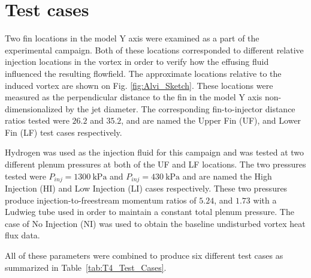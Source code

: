\documentclass{AIAA}
\begin{document}
\section{Test cases}

Two fin locations in the model Y axis were examined as a part of the experimental campaign.
Both of these locations corresponded to different relative injection locations in the vortex in order to verify how the effusing fluid influenced the resulting flowfield.
The approximate locations relative to the induced vortex are shown on Fig. \ref{fig:Alvi_Sketch}.
These locations were measured as the perpendicular distance to the fin in the model Y axis  non-dimensionalized by the jet diameter.
The corresponding fin-to-injector distance ratios tested were $26.2$ and $35.2$, and are named the Upper Fin (UF), and Lower Fin (LF) test cases respectively.


Hydrogen was used as the injection fluid for this campaign and was tested at two different plenum pressures at both of the UF and LF locations.
The two pressures tested were $P_{inj}=\SI{1300}{\kilo\pascal}$ and $P_{inj}=\SI{430}{\kilo\pascal}$ and are named the High Injection (HI) and Low Injection (LI) cases respectively.
These two pressures produce injection-to-freestream momentum ratios of $5.24$, and $1.73$ with a Ludwieg tube used in order to maintain a constant total plenum pressure.
The case of No Injection (NI) was used to obtain the baseline undisturbed vortex heat flux data.


All of these parameters were combined to produce six different test cases as summarized in Table~\ref{tab:T4_Test_Cases}.
	

\end{document}
